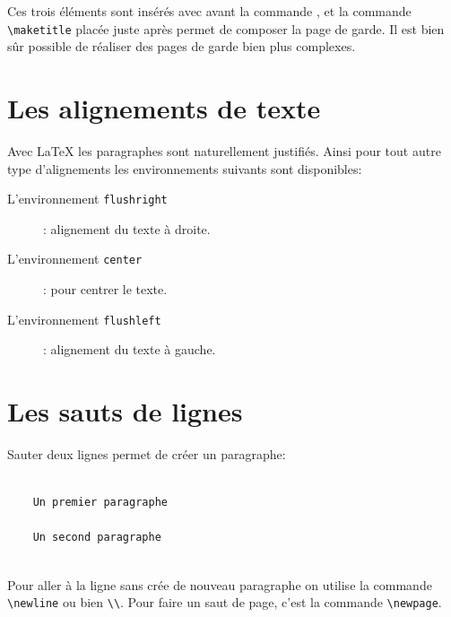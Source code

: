 Ces trois éléments sont insérés avec avant la commande \verb||, et la commande \verb|\maketitle| placée juste après \verb|| permet de composer la page de garde. Il est bien sûr possible de réaliser des pages de garde bien plus complexes.
\medskip

\section{Les alignements de texte}
Avec \LaTeX{} les paragraphes sont naturellement justifiés. Ainsi pour tout autre type d'alignements les environnements suivants sont disponibles:
\begin{description}
\item[L'environnement \texttt{flushright}]: alignement du texte à droite.
\item[L'environnement \texttt{center}]: pour centrer le texte.
\item[L'environnement \texttt{flushleft}]: alignement du texte à gauche.
\end{description}
\medskip

\section{Les sauts de lignes}
Sauter deux lignes permet de créer un paragraphe:
\begin{verbatim}
    
    Un premier paragraphe
    
    Un second paragraphe
    
\end{verbatim}
\medskip

Pour aller à la ligne sans crée de nouveau paragraphe on utilise la commande \verb|\newline| ou bien \verb|\\|. Pour faire un saut de page, c'est la commande \verb|\newpage|.
\medskip

